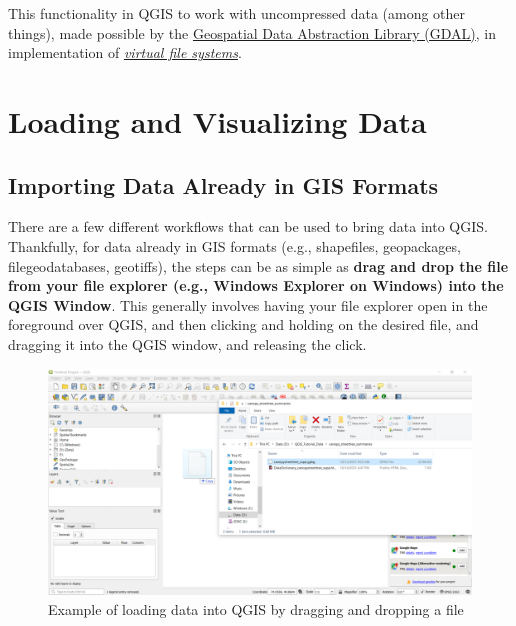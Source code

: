 \documentclass[
  letterpaper,
  DIV=11,
  numbers=noendperiod]{scrreprt}
\begin{document}
This functionality in QGIS to work with uncompressed data (among other
things), made possible by the \href{https://gdal.org}{Geospatial Data
Abstraction Library (GDAL)}, in implementation of
\href{https://gdal.org/user/virtual_file_systems.html}{\emph{virtual
file systems}}.


\hypertarget{loading-and-visualizing-data}{%
\chapter{Loading and Visualizing
Data}\label{loading-and-visualizing-data}}

\hypertarget{importing-data-already-in-gis-formats}{%
\section{Importing Data Already in GIS
Formats}\label{importing-data-already-in-gis-formats}}

There are a few different workflows that can be used to bring data into
QGIS. Thankfully, for data already in GIS formats (e.g., shapefiles,
geopackages, filegeodatabases, geotiffs), the steps can be as simple as
\textbf{drag and drop the file from your file explorer (e.g., Windows
Explorer on Windows) into the QGIS Window}. This generally involves
having your file explorer open in the foreground over QGIS, and then
clicking and holding on the desired file, and dragging it into the QGIS
window, and releasing the click.

\begin{figure}

{\centering \includegraphics{./images/draganddrop_data.png}

}

\caption{Example of loading data into QGIS by dragging and dropping a
file}

\end{figure}
\end{document}
